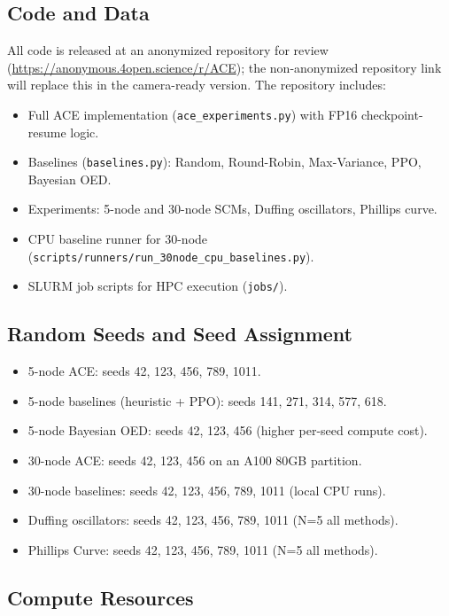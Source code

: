 \subsection{Code and Data}

All code is released at an anonymized repository for review (\url{https://anonymous.4open.science/r/ACE}); the non-anonymized repository link will replace this in the camera-ready version. The repository includes:
\begin{itemize}[leftmargin=1.2em,topsep=0.2em,itemsep=0.1em]
\item Full ACE implementation (\texttt{ace\_experiments.py}) with FP16 checkpoint-resume logic.
\item Baselines (\texttt{baselines.py}): Random, Round-Robin, Max-Variance, PPO, Bayesian OED.
\item Experiments: 5-node and 30-node SCMs, Duffing oscillators, Phillips curve.
\item CPU baseline runner for 30-node (\texttt{scripts/runners/run\_30node\_cpu\_baselines.py}).
\item SLURM job scripts for HPC execution (\texttt{jobs/}).
\end{itemize}

\subsection{Random Seeds and Seed Assignment}

\begin{itemize}[leftmargin=1.2em,topsep=0.2em,itemsep=0.1em]
\item 5-node ACE: seeds 42, 123, 456, 789, 1011.
\item 5-node baselines (heuristic + PPO): seeds 141, 271, 314, 577, 618.
\item 5-node Bayesian OED: seeds 42, 123, 456 (higher per-seed compute cost).
\item 30-node ACE: seeds 42, 123, 456 on an A100 80GB partition.
\item 30-node baselines: seeds 42, 123, 456, 789, 1011 (local CPU runs).
\item Duffing oscillators: seeds 42, 123, 456, 789, 1011 (N=5 all methods).
\item Phillips Curve: seeds 42, 123, 456, 789, 1011 (N=5 all methods).
\end{itemize}

\subsection{Compute Resources}

